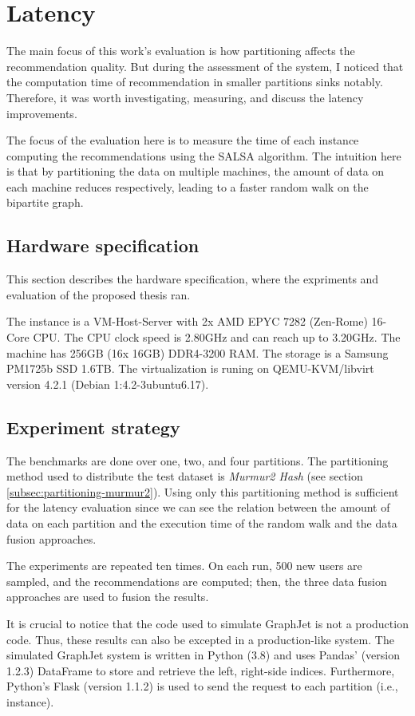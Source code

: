 \section{Latency}
\label{sec:eval-latency}
The main focus of this work's evaluation is how partitioning affects the recommendation quality. But during the assessment of the system, I noticed that the computation time of recommendation in smaller partitions sinks notably. Therefore, it was worth investigating, measuring, and discuss the latency improvements.


The focus of the evaluation here is to measure the time of each instance computing the recommendations using the SALSA algorithm. The intuition here is that by partitioning the data on multiple machines, the amount of data on each machine reduces respectively, leading to a faster random walk on the bipartite graph. 

\subsection{Hardware specification}
\label{subsec:hardware-spec}
This section describes the hardware specification, where the expriments and evaluation of the proposed thesis ran.

The instance is a VM-Host-Server with 2x AMD EPYC 7282 (Zen-Rome) 16-Core CPU. The CPU clock speed is 2.80GHz and can reach up to 3.20GHz. The machine has 256GB (16x 16GB) DDR4-3200 RAM. The storage is a Samsung PM1725b SSD 1.6TB. The virtualization is runing on QEMU-KVM/libvirt version 4.2.1 (Debian 1:4.2-3ubuntu6.17).


\subsection{Experiment strategy}
\label{subsec:latency-experiment-strategy}
The benchmarks are done over one, two, and four partitions. The partitioning method used to distribute the test dataset is \emph{Murmur2 Hash} (see section \ref{subsec:partitioning-murmur2}). Using only this partitioning method is sufficient for the latency evaluation since we can see the relation between the amount of data on each partition and the execution time of the random walk and the data fusion approaches.

The experiments are repeated ten times. On each run, 500 new users are sampled, and the recommendations are computed; then, the three data fusion approaches are used to fusion the results.


It is crucial to notice that the code used to simulate GraphJet is not a production code. Thus, these results can also be excepted in a production-like system. The simulated GraphJet system is written in Python (3.8) and uses Pandas' (version 1.2.3) DataFrame to store and retrieve the left, right-side indices. Furthermore, Python's Flask (version 1.1.2) is used to send the request to each partition (i.e., instance).


